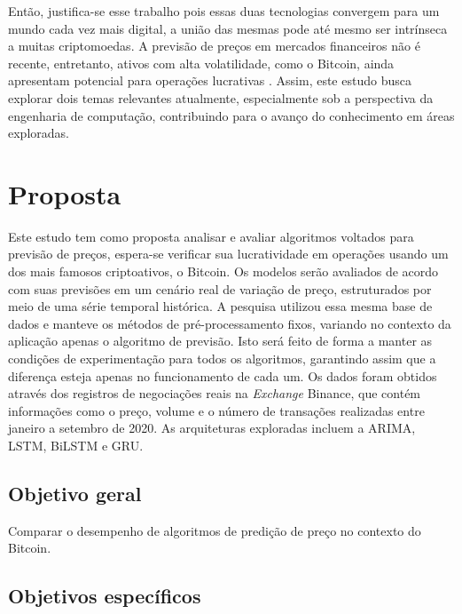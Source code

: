 Então, justifica-se esse trabalho pois essas duas tecnologias convergem
para um mundo cada vez mais digital, a união das mesmas pode até mesmo ser intrínseca a muitas criptomoedas.
A previsão de preços em mercados financeiros não é recente, entretanto, ativos com alta volatilidade, como o Bitcoin, ainda apresentam potencial para operações lucrativas \cite{Tri}.
Assim, este estudo busca explorar dois temas relevantes atualmente, especialmente sob a perspectiva da engenharia de computação, contribuindo para o avanço do conhecimento em áreas exploradas.


\section{Proposta}

Este estudo tem como proposta analisar e avaliar algoritmos voltados para previsão de preços, espera-se verificar sua lucratividade em operações usando um dos mais famosos criptoativos, o Bitcoin.
Os modelos serão avaliados de acordo com suas previsões em um cenário real de variação de preço, estruturados por meio de uma série temporal histórica. A pesquisa utilizou essa mesma base de dados e manteve os métodos de pré-processamento fixos, variando no contexto da aplicação apenas o algoritmo de previsão.
Isto será feito de forma a manter as condições de experimentação para todos os algoritmos, garantindo assim que a diferença esteja apenas no funcionamento de cada um.
Os dados foram obtidos através dos registros de negociações reais na \textit{Exchange}
 Binance, que contém informações como o preço, volume e o número de transações realizadas entre janeiro a setembro de 2020.
As arquiteturas exploradas incluem a ARIMA, LSTM, BiLSTM e GRU.

\subsection{Objetivo geral}

Comparar o desempenho de algoritmos de predição de preço no contexto do Bitcoin.

\subsection{Objetivos específicos}

